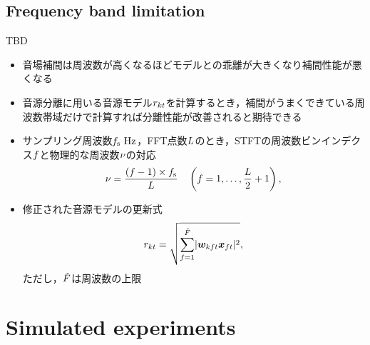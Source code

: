 \documentclass{article}
\begin{document}
\subsection{Frequency band limitation}
TBD
\begin{itemize}
  \item 音場補間は周波数が高くなるほどモデルとの乖離が大きくなり補間性能が悪くなる \cite{Wakabayashi:2020:ASJ:A}
  \item 音源分離に用いる音源モデル$r _{kt}$を計算するとき，補間がうまくできている周波数帯域だけで計算すれば分離性能が改善されると期待できる
  \item サンプリング周波数$\freqSamp~\unit{\hertz}$，FFT点数$L$のとき，STFTの周波数ビンインデクス$f$と物理的な周波数$\nu$の対応
    \begin{equation}
      \nu = \frac{(f - 1)\times f _{\mathrm{s}}}{L} \quad \left(f = 1, \dots, \frac{L}{2} + 1\right),
    \end{equation}
  \item 修正された音源モデルの更新式
    \begin{equation}
      r _{kt} = \sqrt{\sum _{f = 1} ^{\tilde{F}} \lvert \bm{w} _{kft} \bm{x} _{ft} \rvert ^2},
    \end{equation}
    ただし，$\tilde{F}$は周波数の上限
\end{itemize}

\section{Simulated experiments}
\end{document}
